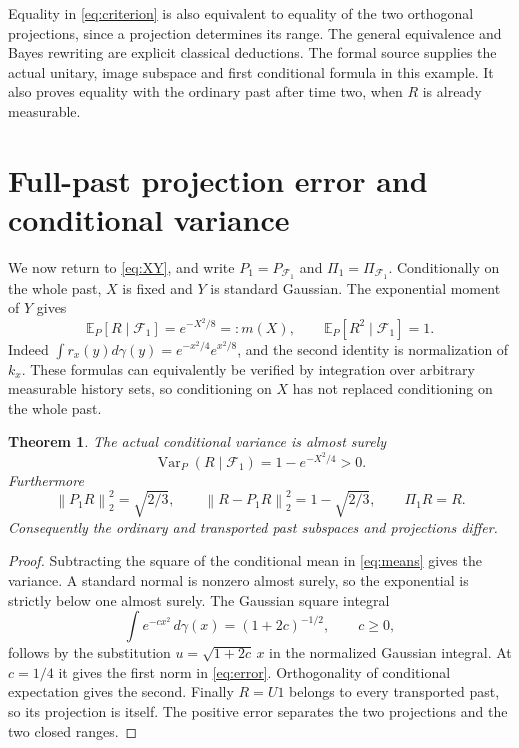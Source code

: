 \documentclass[11pt]{article}
\newtheorem{theorem}{Theorem}[section]
\theoremstyle{remark}\newtheorem{remark}[theorem]{Remark}
\newcommand{\E}{\mathbb E}
\newcommand{\F}{\mathcal F}
\newcommand{\norm}[1]{\left\lVert#1\right\rVert}
\begin{document}
Equality in \eqref{eq:criterion} is also equivalent to equality of the two orthogonal projections, since a projection determines its range. The general equivalence and Bayes rewriting are explicit classical deductions. The formal source supplies the actual unitary, image subspace and first conditional formula in this example. It also proves equality with the ordinary past after time two, when $R$ is already measurable.

\section{Full-past projection error and conditional variance}
We now return to \eqref{eq:XY}, and write $P_1=P_{\F_1}$ and $\Pi_1=\Pi_{\F_1}$. Conditionally on the whole past, $X$ is fixed and $Y$ is standard Gaussian. The exponential moment of $Y$ gives
\begin{equation}\label{eq:means}
 \E_P[R\mid\F_1]=e^{-X^2/8}=:m(X),\qquad
 \E_P[R^2\mid\F_1]=1.
\end{equation}
Indeed $\int r_x(y)d\gamma(y)=e^{-x^2/4}e^{x^2/8}$, and the second identity is normalization of $k_x$. These formulas can equivalently be verified by integration over arbitrary measurable history sets, so conditioning on $X$ has not replaced conditioning on the whole past.

\begin{theorem}\label{thm:energy}
The actual conditional variance is almost surely
\[
 \operatorname{Var}_P(R\mid\F_1)=1-e^{-X^2/4}>0.
\]
Furthermore
\begin{equation}\label{eq:error}
 \norm{P_1R}_2^2=\sqrt{2/3},\qquad
 \norm{R-P_1R}_2^2=1-\sqrt{2/3},\qquad \Pi_1 R=R.
\end{equation}
Consequently the ordinary and transported past subspaces and projections differ.
\end{theorem}
\begin{proof}
Subtracting the square of the conditional mean in \eqref{eq:means} gives the variance. A standard normal is nonzero almost surely, so the exponential is strictly below one almost surely. The Gaussian square integral
\begin{equation}\label{eq:square}
 \int e^{-c x^2}\,d\gamma(x)=(1+2c)^{-1/2},\qquad c\ge0,
\end{equation}
follows by the substitution $u=\sqrt{1+2c}\,x$ in the normalized Gaussian integral. At $c=1/4$ it gives the first norm in \eqref{eq:error}. Orthogonality of conditional expectation gives the second. Finally $R=U1$ belongs to every transported past, so its projection is itself. The positive error separates the two projections and the two closed ranges.
\end{proof}
\end{document}
